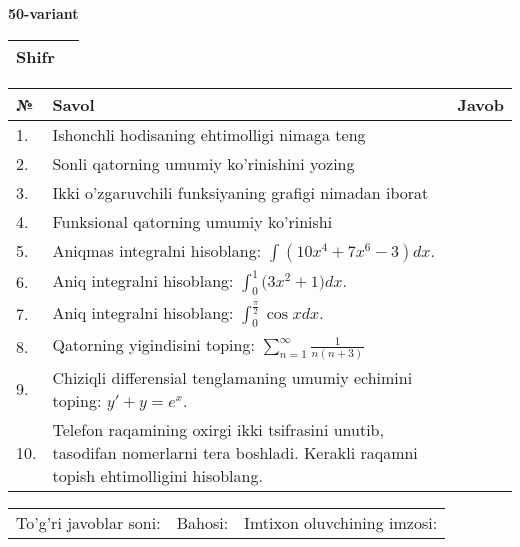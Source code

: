 \documentclass{article}
\begin{document}
  \egroup
  
  \newpage
  
  
  \textbf{50-variant}\\
  
  \bgroup
  \def\arraystretch{1.6} %
  
  \begin{tabular}{|m{5.7cm}|m{9.5cm}|}
  \hline
  Shifr & \\
  \hline
  \end{tabular}
  
  \vspace{1cm}
  
  \begin{tabular}{|m{0.7cm}|m{10cm}|m{4cm}|}
  \hline
  № & Savol & Javob \\
  \hline
  1. & Ishonchli hodisaning ehtimolligi nimaga teng &  \\
  \hline
  2. & Sonli qatorning umumiy ko'rinishini yozing &  \\
  \hline
  3. & Ikki o'zgaruvchili funksiyaning grafigi nimadan iborat &  \\
  \hline
  4. & Funksional qatorning umumiy ko'rinishi &  \\
  \hline
  5. & Aniqmas integralni hisoblang: \(\int {\left( 10x^{4} + 7x^{6} - 3 \right)dx}\). &  \\
  \hline
  6. & Aniq integralni hisoblang: \(\int_{0}^{1}{(3x^{2}} + 1)dx\). &  \\
  \hline
  7. & Aniq integralni hisoblang: \(\int_{0}^{\frac{\pi}{2}}{\cos xdx}\). &  \\
  \hline
  8. & Qatorning yigindisini toping: \(\sum_{n = 1}^{\infty}\frac{1}{n(n + 3)}\) &  \\
  \hline
  9. & Chiziqli differensial tenglamaning umumiy echimini toping: \(y' + y = e^{x}\). &  \\
  \hline
  10. & Telefon raqamining oxirgi ikki tsifrasini unutib, tasodifan nomerlarni tera boshladi. Kerakli raqamni topish ehtimolligini hisoblang. &  \\
  \hline
  \end{tabular}
  
  \vspace{1cm}
  
  \begin{tabular}{lll}
  To'g'ri javoblar soni: \underline{\hspace{1.5cm}} & 
  Bahosi: \underline{\hspace{1.5cm}} & 
  Imtixon oluvchining imzosi: \underline{\hspace{2cm}} \\
  \end{tabular}
  
  \egroup
  
  \newpage
  
  
\end{document}
